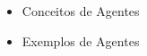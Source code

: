 \cite{whatisagent}
\begin{itemize}
    \item Conceitos de Agentes
    \item Exemplos de Agentes
\end{itemize}